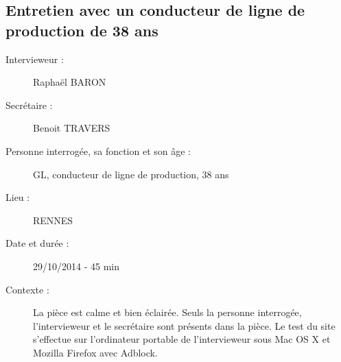 \subsection{Entretien avec un conducteur de ligne de production de 38 ans}

\begin{description}
\item [Intervieweur : ] Rapha\"{e}l BARON
\item [Secr\'{e}taire : ] Benoit TRAVERS
\item [Personne interrog\'{e}e, sa fonction et son \^{a}ge : ] GL, conducteur de ligne de production, 38 ans
\item [Lieu : ] RENNES
\item [Date et dur\'{e}e : ] 29/10/2014 - 45 min
\item [Contexte : ] La pi\`{e}ce est calme et bien \'{e}clair\'{e}e. Seuls la personne interrog\'{e}e, l'intervieweur et le secr\'{e}taire sont pr\'{e}sents dans la pi\`{e}ce. Le test du site s'effectue sur l'ordinateur portable de l'intervieweur sous Mac OS X et Mozilla Firefox avec Adblock. 

\end{description}


